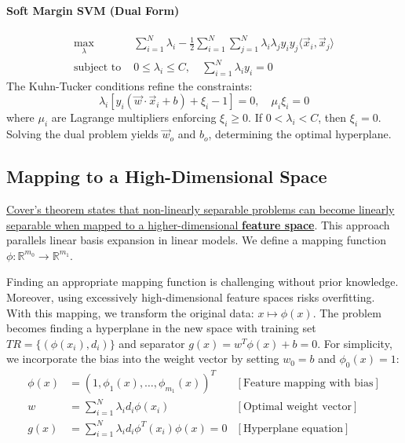 \paragraph{Soft Margin SVM (Dual Form)}
\begin{align*}
    \max_{\lambda} & \sum_{i=1}^N \lambda_i - \frac{1}{2} \sum_{i=1}^N \sum_{j=1}^N \lambda_i \lambda_j y_i y_j \langle \vec{x}_i, \vec{x}_j \rangle\\
\text{subject to } & 0 \leq \lambda_i \leq C, \quad \sum_{i=1}^N \lambda_i y_i = 0
\end{align*}
The Kuhn-Tucker conditions refine the constraints:
\begin{equation}
\lambda_i [y_i (\vec{w} \cdot \vec{x}_i + b) + \xi_i - 1] = 0, \quad \mu_i \xi_i = 0    
\end{equation}
where $\mu_i$ are Lagrange multipliers enforcing $\xi_i \geq 0$. If $0 < \lambda_i < C$, then $\xi_i = 0$.  
Solving the dual problem yields $\vec{w}_o$ and $b_o$, determining the optimal hyperplane.


\subsection{Mapping to a High-Dimensional Space}
\href{https://en.wikipedia.org/wiki/Cover%27s_theorem#The_Theorem}{Cover's theorem states that non-linearly separable problems can become linearly separable when mapped to a higher-dimensional \textbf{feature space}}. This approach parallels linear basis expansion in linear models. We define a mapping function $\phi: \mathbb{R}^{m_0} \rightarrow \mathbb{R}^{m_1}$.

Finding an appropriate mapping function is challenging without prior knowledge. Moreover, using excessively high-dimensional feature spaces risks overfitting. With this mapping, we transform the original data: $x \mapsto \phi(x)$. The problem becomes finding a hyperplane in the new space with training set $TR = \{(\phi(x_i), d_i)\}$ and separator $g(x) = w^T \phi(x) + b = 0$. For simplicity, we incorporate the bias into the weight vector by setting $w_0 = b$ and $\phi_0(x) = 1$:
\begin{align}
\phi(x) &= (1, \phi_1(x), \ldots, \phi_{m_1}(x))^T &[\text{Feature mapping with bias}]\\
w &= \sum_{i=1}^N \lambda_i d_i \phi(x_i) &[\text{Optimal weight vector}]\\
g(x) &= \sum_{i=1}^N \lambda_i d_i \phi^T(x_i) \phi(x) = 0 & [\text{Hyperplane equation}]
\end{align}

